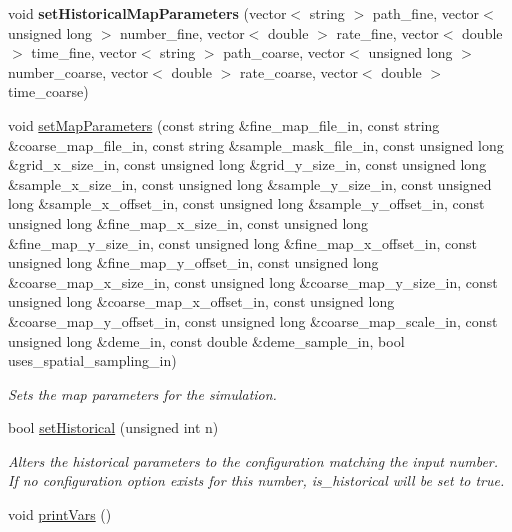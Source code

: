 \begin{DoxyCompactItemize}
void {\bfseries set\+Historical\+Map\+Parameters} (vector$<$ string $>$ path\+\_\+fine, vector$<$ unsigned long $>$ number\+\_\+fine, vector$<$ double $>$ rate\+\_\+fine, vector$<$ double $>$ time\+\_\+fine, vector$<$ string $>$ path\+\_\+coarse, vector$<$ unsigned long $>$ number\+\_\+coarse, vector$<$ double $>$ rate\+\_\+coarse, vector$<$ double $>$ time\+\_\+coarse)\hypertarget{struct_sim_parameters_ae86196bee7f469e308d23e7dbbf7320c}{}\label{struct_sim_parameters_ae86196bee7f469e308d23e7dbbf7320c}

\item 
void \hyperlink{struct_sim_parameters_a4073ee2bf48a25eebdc0439e3b8625e7}{set\+Map\+Parameters} (const string \&fine\+\_\+map\+\_\+file\+\_\+in, const string \&coarse\+\_\+map\+\_\+file\+\_\+in, const string \&sample\+\_\+mask\+\_\+file\+\_\+in, const unsigned long \&grid\+\_\+x\+\_\+size\+\_\+in, const unsigned long \&grid\+\_\+y\+\_\+size\+\_\+in, const unsigned long \&sample\+\_\+x\+\_\+size\+\_\+in, const unsigned long \&sample\+\_\+y\+\_\+size\+\_\+in, const unsigned long \&sample\+\_\+x\+\_\+offset\+\_\+in, const unsigned long \&sample\+\_\+y\+\_\+offset\+\_\+in, const unsigned long \&fine\+\_\+map\+\_\+x\+\_\+size\+\_\+in, const unsigned long \&fine\+\_\+map\+\_\+y\+\_\+size\+\_\+in, const unsigned long \&fine\+\_\+map\+\_\+x\+\_\+offset\+\_\+in, const unsigned long \&fine\+\_\+map\+\_\+y\+\_\+offset\+\_\+in, const unsigned long \&coarse\+\_\+map\+\_\+x\+\_\+size\+\_\+in, const unsigned long \&coarse\+\_\+map\+\_\+y\+\_\+size\+\_\+in, const unsigned long \&coarse\+\_\+map\+\_\+x\+\_\+offset\+\_\+in, const unsigned long \&coarse\+\_\+map\+\_\+y\+\_\+offset\+\_\+in, const unsigned long \&coarse\+\_\+map\+\_\+scale\+\_\+in, const unsigned long \&deme\+\_\+in, const double \&deme\+\_\+sample\+\_\+in, bool uses\+\_\+spatial\+\_\+sampling\+\_\+in)
\begin{DoxyCompactList}\small\item\em Sets the map parameters for the simulation. \end{DoxyCompactList}\item 
bool \hyperlink{struct_sim_parameters_adae32b41ebc9b9bd0ae89ceb039430b4}{set\+Historical} (unsigned int n)
\begin{DoxyCompactList}\small\item\em Alters the historical parameters to the configuration matching the input number. If no configuration option exists for this number, is\+\_\+historical will be set to true. \end{DoxyCompactList}\item 
void \hyperlink{struct_sim_parameters_ac7072f58a9dccc718341d25a84148ffc}{print\+Vars} ()\hypertarget{struct_sim_parameters_ac7072f58a9dccc718341d25a84148ffc}{}\label{struct_sim_parameters_ac7072f58a9dccc718341d25a84148ffc}


\end{DoxyCompactItemize}
